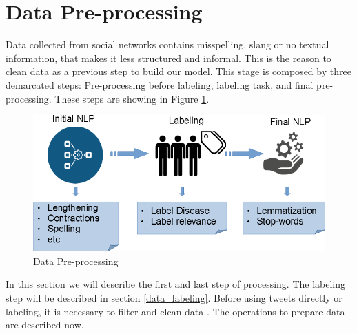\documentclass[12pt]{report}
\begin{document}
\section{Data Pre-processing} \label{data_preprocessing}

Data collected from social networks contains misspelling, slang or no textual information, that makes it less structured and informal. This is the reason to clean data as a previous step to build our model. This stage is composed by three demarcated steps: Pre-processing before labeling, labeling task, and final pre-processing. These steps are showing in Figure \ref{figure:data_preprocessing}. 

\begin{figure}[H]	
	\centering
	\includegraphics[width=150mm, scale = 0.8]{images/9_data_preprocessing.png}	
	\caption{Data Pre-processing}	
	\label{figure:data_preprocessing}
\end{figure}

In this section we will describe the first and last step of processing. The labeling step will be described in section \ref{data_labeling}. Before using tweets directly or labeling, it is necessary to filter and clean data \cite{Dai2017} \cite{Ahuja2017} \cite{Halibas2018}. The operations to prepare data are described now.
\end{document}
